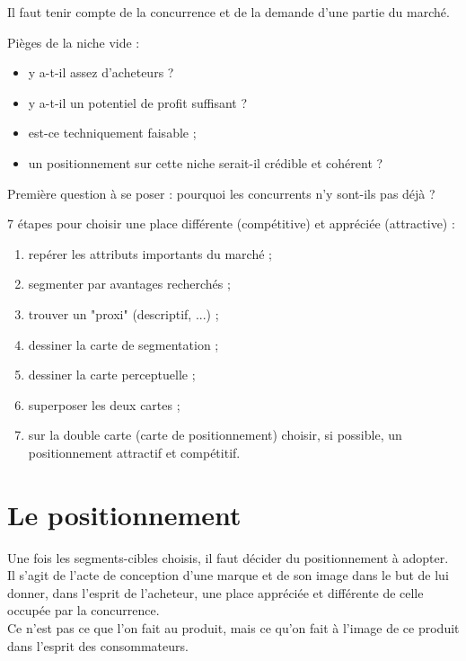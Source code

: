 		Il faut tenir compte de la concurrence et de la demande d'une partie du marché.
		
		Pièges de la niche vide :
		
		\begin{itemize}
			\item y a-t-il assez d'acheteurs ?
			\item y a-t-il un potentiel de profit suffisant ?
			\item est-ce techniquement faisable ;
			\item un positionnement sur cette niche serait-il crédible et cohérent ?
		\end{itemize}
		
		Première question à se poser : pourquoi les concurrents n'y sont-ils pas déjà ?
		
	
		7 étapes pour choisir une place différente (compétitive) et appréciée (attractive) :
		
		\begin{enumerate}		
			\item repérer les attributs importants du marché ;
			\item segmenter par avantages recherchés ;
			\item trouver un "proxi" (descriptif, ...) ;
			\item dessiner la carte de segmentation ;
			\item dessiner la carte perceptuelle ;
			\item superposer les deux cartes ;
			\item sur la double carte (carte de positionnement) choisir, si possible, un positionnement attractif et compétitif.
		\end{enumerate}
		
	\section{Le positionnement}
	
	
	Une fois les segments-cibles choisis, il faut décider du positionnement à adopter. Il s'agit de l'acte de conception d'une marque et de son image dans le but de lui donner, dans l'esprit de l'acheteur, une place appréciée et différente de celle occupée par la concurrence. \\
	
	Ce n'est pas ce que l'on fait au produit, mais ce qu'on fait à l'image de ce produit dans l'esprit des consommateurs.
	
